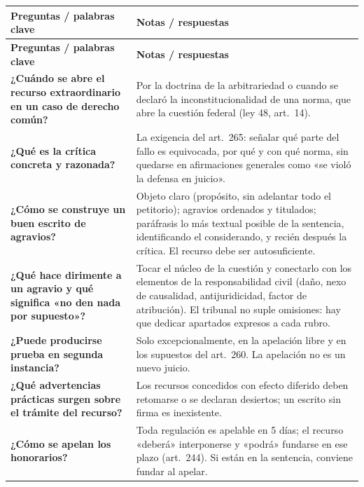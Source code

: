 \documentclass[12pt,oneside]{book}
\begin{document}
\begin{longtable}{>{\raggedright\arraybackslash}p{}>{\raggedright\arraybackslash}p{}}
\toprule
\textbf{Preguntas / palabras clave} & \textbf{Notas / respuestas} \\
\midrule
\endfirsthead
\toprule
\textbf{Preguntas / palabras clave} & \textbf{Notas / respuestas} \\
\midrule
\endhead

\textbf{¿Cuándo se abre el recurso extraordinario en un caso de derecho común?} &
Por la doctrina de la arbitrariedad o cuando se declaró la inconstitucionalidad de una norma, que abre la cuestión federal (ley 48, art.~14). \\[0.6em]

\textbf{¿Qué es la crítica concreta y razonada?} &
La exigencia del art.~265: señalar qué parte del fallo es equivocada, por qué y con qué norma, sin quedarse en afirmaciones generales como «se violó la defensa en juicio». \\[0.6em]

\textbf{¿Cómo se construye un buen escrito de agravios?} &
Objeto claro (propósito, sin adelantar todo el petitorio); agravios ordenados y titulados; paráfrasis lo más textual posible de la sentencia, identificando el considerando, y recién después la crítica. El recurso debe ser autosuficiente. \\[0.6em]

\textbf{¿Qué hace dirimente a un agravio y qué significa «no den nada por supuesto»?} &
Tocar el núcleo de la cuestión y conectarlo con los elementos de la responsabilidad civil (daño, nexo de causalidad, antijuridicidad, factor de atribución). El tribunal no suple omisiones: hay que dedicar apartados expresos a cada rubro. \\[0.6em]

\textbf{¿Puede producirse prueba en segunda instancia?} &
Solo excepcionalmente, en la apelación libre y en los supuestos del art.~260. La apelación no es un nuevo juicio. \\[0.6em]

\textbf{¿Qué advertencias prácticas surgen sobre el trámite del recurso?} &
Los recursos concedidos con efecto diferido deben retomarse o se declaran desiertos; un escrito sin firma es inexistente. \\[0.6em]

\textbf{¿Cómo se apelan los honorarios?} &
Toda regulación es apelable en 5 días; el recurso «deberá» interponerse y «podrá» fundarse en ese plazo (art.~244). Si están en la sentencia, conviene fundar al apelar. \\[0.6em]


\end{longtable}
\end{document}
